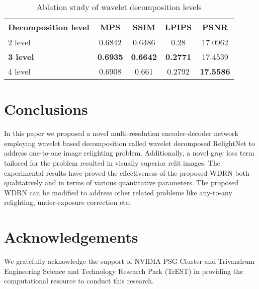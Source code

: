 \documentclass[runningheads]{llncs}
\begin{document}
\begin{table}[h!]
\centering
\caption{Ablation study of wavelet decomposition levels}
\begin{tabular}{l||c|c|c|c|}
Decomposition level &\textbf{MPS}&SSIM&LPIPS&PSNR \\
\hline\hline
2 level & 0.6842 & 0.6486 & 0.28 & 17.0962\\
\textbf{3 level} & \textbf{0.6935} & \textbf{0.6642} & \textbf{0.2771} & 17.4539\\
4 level & 0.6908 & 0.661  & 0.2792 & \textbf{17.5586}\\
\end{tabular}
\label{tab:table_ablation_levels}
\end{table}

\section{Conclusions}
\label{section:conclusions}
In this paper we proposed a novel multi-resolution encoder-decoder network employing wavelet based decomposition called wavelet decomposed RelightNet to address one-to-one image relighting problem. Additionally, a novel gray loss term tailored for the problem resulted in visually superior relit images. The experimental results have proved the effectiveness of the proposed WDRN both qualitatively and in terms of various quantitative parameters. The proposed WDRN can be modified to address other related problems like any-to-any relighting, under-exposure correction etc.

\section*{Acknowledgements}
We gratefully acknowledge the support of NVIDIA PSG Cluster and Trivandrum Engineering Science and Technology Research Park (TrEST) in providing the computational resource to conduct this research.


\clearpage


\end{document}
